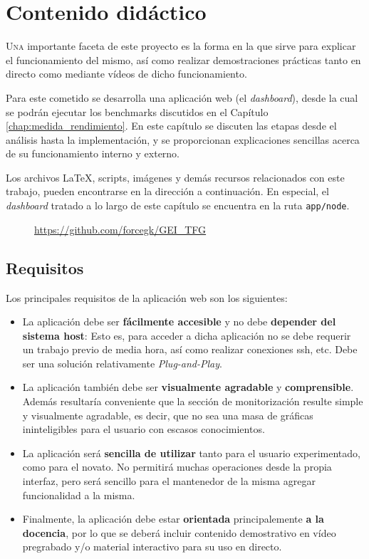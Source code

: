 \chapter{Contenido didáctico}
\label{chap:contenido_didactico}

\lettrine{U}{na} importante faceta de este proyecto es la forma en la que sirve para explicar el funcionamiento del mismo, así como realizar demostraciones prácticas tanto en directo como mediante vídeos de dicho funcionamiento.

Para este cometido se desarrolla una aplicación web (el \textit{dashboard}), desde la cual se podrán ejecutar los benchmarks discutidos en el Capítulo \ref{chap:medida_rendimiento}. En este capítulo se discuten las etapas desde el análisis hasta la implementación, y se proporcionan explicaciones sencillas acerca de su funcionamiento interno y externo.

Los archivos \LaTeX, scripts, imágenes y demás recursos relacionados con este trabajo, pueden encontrarse en la dirección a continuación. En especial, el \textit{dashboard} tratado a lo largo de este capítulo se encuentra en la ruta \texttt{app/node}. 

\begin{figure}[H]
    \vspace{0.2cm}
    \centering
    \url{https://github.com/forcegk/GEI_TFG}
\end{figure}

\section{Requisitos}
Los principales requisitos de la aplicación web son los siguientes:

\begin{itemize}
    \item La aplicación debe ser \textbf{fácilmente accesible} y no debe \textbf{depender del sistema host}: Esto es, para acceder a dicha aplicación no se debe requerir un trabajo previo de media hora, así como realizar conexiones \acrshort{ssh}, etc. Debe ser una solución relativamente \textit{Plug-and-Play}.
    \item La aplicación también debe ser \textbf{visualmente agradable} y \textbf{comprensible}. Además resultaría conveniente que la sección de monitorización resulte simple y visualmente agradable, es decir, que no sea una masa de gráficas ininteligibles para el usuario con escasos conocimientos.
    \item La aplicación será \textbf{sencilla de utilizar} tanto para el usuario experimentado, como para el novato. No permitirá muchas operaciones desde la propia interfaz, pero será sencillo para el mantenedor de la misma agregar funcionalidad a la misma.
    \item Finalmente, la aplicación debe estar \textbf{orientada} principalemente \textbf{a la docencia}, por lo que se deberá incluir contenido demostrativo en vídeo pregrabado y/o material interactivo para su uso en directo.
\end{itemize}

